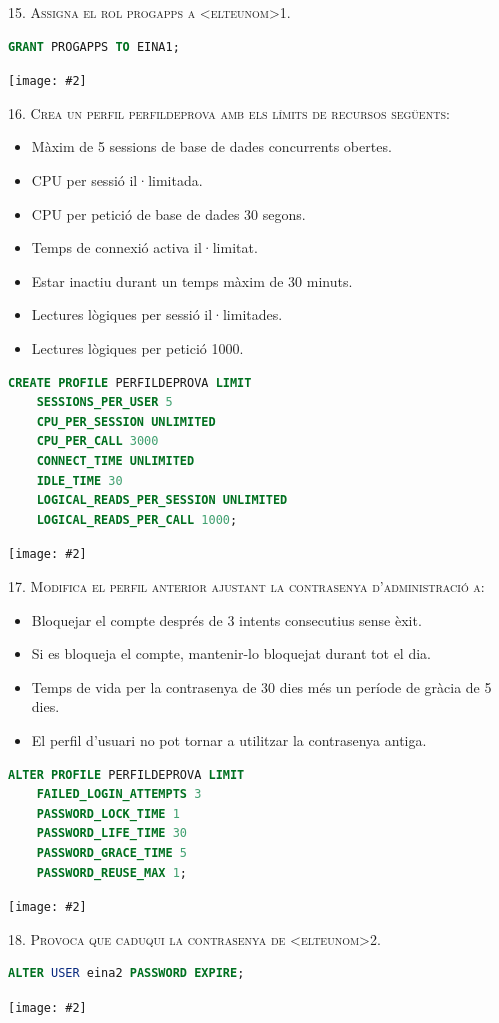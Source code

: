 \documentclass[a4paper,12pt]{article}
\newcommand{\mygraphic}[2][width=\textwidth]{\begin{center}
		\centering\texttt{[image: \#2]}\par
\end{center}}
\begin{document}
\newpage
\textsc{15. Assigna el rol progapps a <elteunom>1.}
\begin{lstlisting}[language=SQL]
GRANT PROGAPPS TO EINA1;
\end{lstlisting}
\mygraphic{imatges/15.png}

\textsc{16. Crea un perfil perfildeprova amb els límits de recursos següents:}
\begin{itemize}
	\item Màxim de 5 sessions de base de dades concurrents obertes.
	\item CPU per sessió il·limitada.
	\item CPU per petició de base de dades 30 segons.
	\item Temps de connexió activa il·limitat.
	\item Estar inactiu durant un temps màxim de 30 minuts.
	\item Lectures lògiques per sessió il·limitades.
	\item Lectures lògiques per petició 1000.
\end{itemize}
\begin{lstlisting}[language=SQL]
CREATE PROFILE PERFILDEPROVA LIMIT
	SESSIONS_PER_USER 5
	CPU_PER_SESSION UNLIMITED
	CPU_PER_CALL 3000
	CONNECT_TIME UNLIMITED
	IDLE_TIME 30
	LOGICAL_READS_PER_SESSION UNLIMITED
	LOGICAL_READS_PER_CALL 1000;
\end{lstlisting}
\mygraphic{imatges/16.png}

\textsc{17. Modifica el perfil anterior ajustant la contrasenya d'administració a:}
\begin{itemize}
	\item Bloquejar el compte després de 3 intents consecutius sense èxit.
	\item Si es bloqueja el compte, mantenir-lo bloquejat durant tot el dia.
	\item Temps de vida per la contrasenya de 30 dies més un període de gràcia de 5 dies.
	\item El perfil d'usuari no pot tornar a utilitzar la contrasenya antiga.
\end{itemize}
\begin{lstlisting}[language=SQL]
ALTER PROFILE PERFILDEPROVA LIMIT
	FAILED_LOGIN_ATTEMPTS 3
	PASSWORD_LOCK_TIME 1
	PASSWORD_LIFE_TIME 30
	PASSWORD_GRACE_TIME 5
	PASSWORD_REUSE_MAX 1;
\end{lstlisting}
\mygraphic{imatges/17.png}

\textsc{18. Provoca que caduqui la contrasenya de <elteunom>2.}
\begin{lstlisting}[language=SQL]
ALTER USER eina2 PASSWORD EXPIRE;
\end{lstlisting}
\mygraphic{imatges/18.png}
\end{document}
